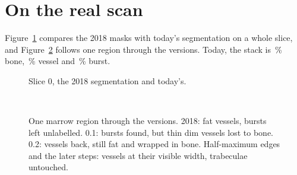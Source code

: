 \section{On the real scan}

Figure~\ref{fig:real-overview} compares the 2018 masks with today's segmentation on a whole slice, and
Figure~\ref{fig:real-evolution} follows one region through the versions. Today, the stack is
\pbValueFracBone\,\% bone, \pbValueFracVessel\,\% vessel and \pbValueFracBurst\,\% burst.

\begin{figure}[ht]
\centering
{}\hspace{0.05\linewidth}
\caption{Slice 0, the 2018 segmentation and today's.}
\label{fig:real-overview}
\end{figure}

\begin{figure}[p]
\centering
{}\hfill
{}\hfill
{}\\[6pt]
\hfill
{}\hfill
{}
\caption{One marrow region through the versions. 2018: fat vessels, bursts left unlabelled. 0.1: bursts
  found, but thin dim vessels lost to bone. 0.2: vessels back, still fat and wrapped in bone. Half-maximum
  edges and the later steps: vessels at their visible width, trabeculae untouched.}
\label{fig:real-evolution}
\end{figure}
